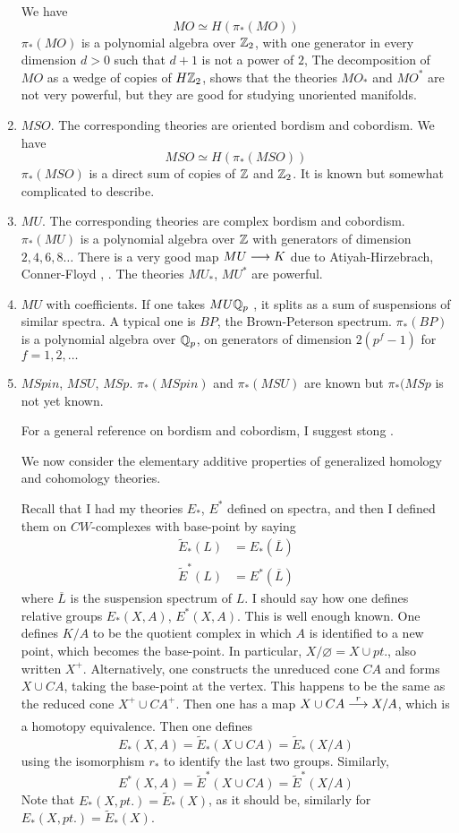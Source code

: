 \documentclass[../main]{subfiles}
\begin{document}
\begin{enumerate}
    We have
    \[MO\simeq H \left( \pi_\ast(MO) \right)\]
    $\pi_\ast(MO)$ is a polynomial algebra over $\mathbb{Z}_2$, with one generator in every dimension $d>0$ such that $d+1$ is not a power of $2$, The decomposition of $MO$ as a wedge of copies of $H\mathbb{Z}_2$, shows that the theories $MO_\ast$ and $MO^\ast$ are not very powerful, but they are good for studying unoriented manifolds.
    \item $MSO$. The corresponding theories are oriented bordism and cobordism. We have
    \[MSO\simeq H \left( \pi_\ast(MSO) \right)\]
    $\pi_\ast(MSO)$ is a direct sum of copies of $\mathbb{Z}$ and $\mathbb{Z}_2$. It is known but somewhat complicated to describe.
    \item $MU$. The corresponding theories are complex bordism and cobordism. $\pi_\ast(MU)$ is a polynomial algebra over $\mathbb{Z}$ with generators of dimension $2,4,6,8\dots$ There is a very good map $MU\longrightarrow K$  due to Atiyah-Hirzebrach, Conner-Floyd \plscite{[3]}, \plscite{[5]}. The theories $MU_\ast$, $MU^\ast$ are powerful.
    \item $MU$ with coefficients. If one takes $MU\mathbb{Q}_p$ , it splits as a sum of suspensions of similar spectra. A typical one is $BP$, the Brown-Peterson spectrum. $\pi_\ast(BP)$ is a polynomial algebra over $\mathbb{Q}_p$, on generators of dimension $2(p^f-1)$ for $f=1, 2, \dots$
    \item $MSpin$, $MSU$, $MSp$. $\pi_\ast(MSpin)$ and $\pi_\ast(MSU)$ are known but $\pi_\ast(MSp$ is not yet known.
    
    For a general reference on bordism and cobordism, I suggest stong \plscite{[16]}.
    
    We now consider the elementary additive properties of generalized homology and cohomology theories.
    
    Recall that I had my theories $E_\ast$, $E^\ast$ defined on spectra, and then I defined them on $CW$-complexes with base-point by saying
    \begin{align}
        \widetilde{E}_\ast(L) &= E_\ast(\overline{L}) \nonumber \\
        \widetilde{E}^\ast(L) &= E^\ast(\overline{L}) \nonumber
    \end{align}
    where $\overline{L}$ is the suspension spectrum of $L$. I should say how one defines relative groups $E_\ast(X,A)$, $E^\ast(X, A)$. This is well enough known. One defines $K/A$ to be the quotient complex in which $A$ is identified to a new point, which becomes the base-point. In particular, $X/\varnothing=X\cup pt$., also written $X^+$. Alternatively, one constructs the unreduced cone $CA$ and forms $X\cup CA$, taking the base-point at the vertex. This happens to be the same as the reduced cone $X^+ \cup CA^+$. Then one has a map $X\cup CA\vra{r} X/A$, which is a homotopy equivalence. Then one defines
    \[E_\ast(X,A) = \widetilde{E}_\ast(X\cup CA)=\widetilde{E}_\ast(X/A)\]
    using the isomorphism $r_\ast$ to identify the last two groups. Similarly,
    \[E^\ast(X,A) = \widetilde{E}^\ast(X\cup CA)=\widetilde{E}^\ast(X/A)\]
    Note that $E_\ast(X, pt.)=\widetilde{E}_\ast(X)$, as it should be, similarly for $E_\ast(X, pt.)=\widetilde{E}_\ast(X)$.
    

\end{enumerate}
\end{document}
